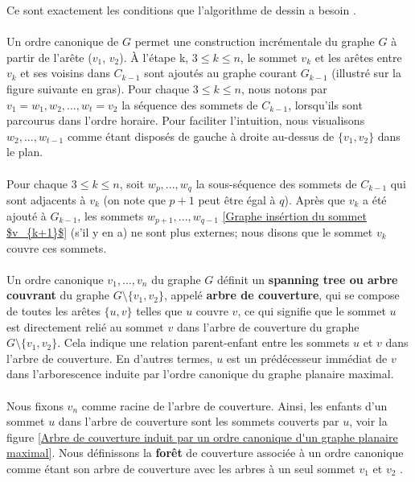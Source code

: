 \documentclass[hidelinks,letterpaper,12pt]{article}
\begin{document}
\bigbreak 	
Ce sont exactement les conditions que l'algorithme de dessin a besoin \citep{PhilippKindermann} \citep{VismaraTamassia}.
\\ \\	
Un ordre canonique de $G$ permet une construction incrémentale du graphe $G$ à partir de l'arête ($v_{1}$, $v_{2}$). À l'étape k, \( 3 \leq k \leq n \), le sommet $v_k$ et les arêtes entre $v_k$ et ses voisins dans $C_{k-1}$ sont ajoutés au graphe courant $G_{k-1}$ (illustré sur la figure suivante en gras). Pour chaque \( 3 \leq k \leq n \), nous notons par \( v_1 = w_1, w_2, ..., w_t = v_2 \) la séquence des sommets de $C_{k-1}$, lorsqu'ils sont parcourus dans l'ordre horaire. Pour faciliter l'intuition, nous visualisons \( w_2, ..., w_{t-1} \) comme étant disposés de gauche à droite au-dessus de \(\{v_1,v_2\}\) dans le plan. 
\\ \\
Pour chaque \( 3 \leq k \leq n \), soit \( w_p, ..., w_q \) la sous-séquence des sommets de $C_{k-1}$ qui sont adjacents à $v_k$ (on note que \(p + 1\) peut être égal à $q$). Après que $v_k$ a été ajouté à $G_{k-1}$, les sommets \( w_{p+1}, ..., w_{q-1} \) \ref{Graphe insértion du sommet $v_{k+1}$} (s'il y en a) ne sont plus externes; nous disons que le sommet $v_k$ couvre ces sommets.
\\ \\
Un ordre canonique \( v_1, ..., v_n \) du graphe $G$ définit un \textbf{spanning tree ou arbre couvrant} du graphe \(G \setminus \{v_1, v_2\} \), appelé \textbf{arbre de couverture}, qui se compose de toutes les arêtes \(\{u,v\}\) telles que $u$ couvre $v$, ce qui signifie que le sommet $u$ est directement relié au sommet $v$ dans l'arbre de couverture du graphe \(G \setminus \{v_1, v_2\} \). Cela indique une relation parent-enfant entre les sommets $u$ et $v$ dans l'arbre de couverture. En d'autres termes, $u$ est un prédécesseur immédiat de $v$ dans l'arborescence induite par l'ordre canonique du graphe planaire maximal.
\\ \\
Nous fixons $v_n$ comme racine de l'arbre de couverture. Ainsi, les enfants d'un sommet $u$ dans l'arbre de couverture sont les sommets couverts par $u$, voir la figure \ref{Arbre de couverture induit par un ordre canonique d'un graphe planaire maximal}. Nous définissons la \textbf{forêt} de couverture associée à un ordre canonique comme étant son arbre de couverture avec les arbres à un seul sommet $v_1$ et $v_2$ \citep{VismaraTamassia}.
\end{document}
